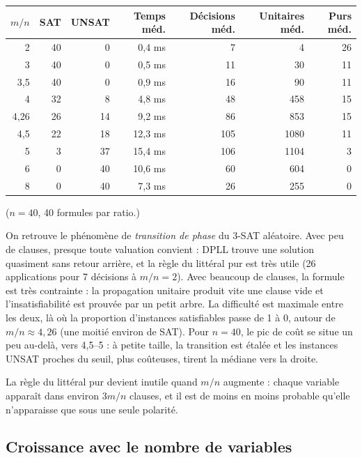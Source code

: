 \documentclass[11pt,a4paper]{article}
\begin{document}
\begin{center}
\begin{tabular}{rrrrrrr}
  $m/n$ & SAT & UNSAT & Temps méd. & Décisions méd. & Unitaires méd. & Purs méd. \\
  \hline
  2    & 40 & 0  & 0,4 ms  & 7   & 4    & 26 \\
  3    & 40 & 0  & 0,5 ms  & 11  & 30   & 11 \\
  3,5  & 40 & 0  & 0,9 ms  & 16  & 90   & 11 \\
  4    & 32 & 8  & 4,8 ms  & 48  & 458  & 15 \\
  4,26 & 26 & 14 & 9,2 ms  & 86  & 853  & 15 \\
  4,5  & 22 & 18 & 12,3 ms & 105 & 1080 & 11 \\
  5    & 3  & 37 & 15,4 ms & 106 & 1104 & 3 \\
  6    & 0  & 40 & 10,6 ms & 60  & 604  & 0 \\
  8    & 0  & 40 & 7,3 ms  & 26  & 255  & 0 \\
\end{tabular}
\end{center}
\noindent($n=40$, 40 formules par ratio.)

On retrouve le phénomène de \emph{transition de phase} du 3-SAT aléatoire.
Avec peu de clauses, presque toute valuation convient : DPLL trouve une
solution quasiment sans retour arrière, et la règle du littéral pur est très
utile (26 applications pour 7 décisions à $m/n=2$). Avec beaucoup de clauses,
la formule est très contrainte : la propagation unitaire produit vite une
clause vide et l'insatisfiabilité est prouvée par un petit arbre. La
difficulté est maximale entre les deux, là où la proportion d'instances
satisfiables passe de 1 à 0, autour de $m/n\approx 4{,}26$ (une moitié
environ de SAT). Pour $n=40$, le pic de coût se situe un peu au-delà, vers
4,5--5 : à petite taille, la transition est étalée et les instances UNSAT
proches du seuil, plus coûteuses, tirent la médiane vers la droite.

La règle du littéral pur devient inutile quand $m/n$ augmente : chaque
variable apparaît dans environ $3m/n$ clauses, et il est de moins en moins
probable qu'elle n'apparaisse que sous une seule polarité.

\subsection{Croissance avec le nombre de variables}
\end{document}
